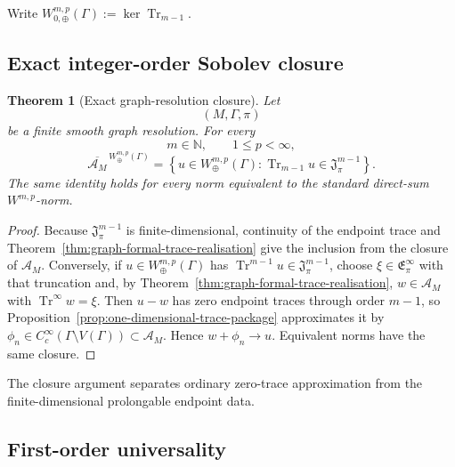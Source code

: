\documentclass[11pt]{article}
\theoremstyle{plain}
\newtheorem{theorem}{Theorem}[section]
\theoremstyle{definition}
\begin{document}
Write
\(W_{0,\oplus}^{m,p}(\Gamma) := \ker\operatorname{Tr}_{m-1}\).

\subsection{Exact integer-order Sobolev closure}
\label{subsec:graph-sobolev-closure}

\begin{theorem}[Exact graph-resolution closure]
\label{thm:exact-graph-resolution-closure}
Let
\[
  (M,\Gamma,\pi)
\]
be a finite smooth graph resolution. For every
\[
  m\in\mathbb N,
  \qquad
  1\leq p<\infty,
\]
\[
  \boxed{
  \overline{\mathscr A_M}^{\,W_\oplus^{m,p}(\Gamma)}
  =
  \left\{
    u\in W_\oplus^{m,p}(\Gamma):
    \operatorname{Tr}_{m-1}u
    \in
    \mathfrak J_\pi^{m-1}
  \right\}.
  }
\]
The same identity holds for every norm equivalent to the standard
direct-sum \(W^{m,p}\)-norm.
\end{theorem}

\begin{proof}
Because \(\mathfrak J_\pi^{m-1}\) is finite-dimensional, continuity of the endpoint trace and Theorem~\ref{thm:graph-formal-trace-realisation} give the inclusion from the closure of \(\mathcal A_M\). Conversely, if \(u\in W_\oplus^{m,p}(\Gamma)\) has \(\operatorname{Tr}^{m-1}u\in\mathfrak J_\pi^{m-1}\), choose \(\xi\in\mathfrak E_\pi^\infty\) with that truncation and, by Theorem~\ref{thm:graph-formal-trace-realisation}, \(w\in\mathcal A_M\) with \(\operatorname{Tr}^\infty w=\xi\). Then \(u-w\) has zero endpoint traces through order \(m-1\), so Proposition~\ref{prop:one-dimensional-trace-package} approximates it by \(\phi_n\in C_c^\infty(\Gamma\setminus V(\Gamma))\subset\mathcal A_M\). Hence \(w+\phi_n\to u\). Equivalent norms have the same closure.
\end{proof}

The closure argument separates ordinary zero-trace approximation from the finite-dimensional prolongable endpoint data.

\subsection{First-order universality}
\label{subsec:graph-first-order-universality}
\end{document}
